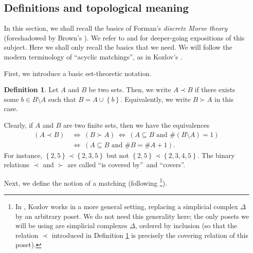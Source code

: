 \documentclass[12pt]{amsart}
\theoremstyle{definition}
\newtheorem{definition}[theorem]{Definition}
\begin{document}
\subsection{Definitions and topological meaning}

In this section, we shall recall the basics of Forman's \emph{discrete Morse
theory} (foreshadowed by Brown's \cite{Brown92}). We refer to
\cite{Forman-user} and \cite{Kozlov20} for deeper-going expositions of this
subject. Here we shall only recall the basics that we need. We will follow the
modern terminology of \textquotedblleft acyclic matchings\textquotedblright,
as in Kozlov's \cite{Kozlov20}.

First, we introduce a basic set-theoretic notation.

\begin{definition}
\label{def.succ}
Let $A$ and $B$ be two sets. Then, we write $A\prec B$ if
there exists some $b\in B\setminus A$ such that $B=A\cup\left\{  b\right\}  $.
Equivalently, we write $B\succ A$ in this case.
\end{definition}

Clearly, if $A$ and $B$ are two finite sets, then we have the equivalences
\begin{align*}
\left(  A\prec B\right)  \  &  \Longleftrightarrow\ \left(  B\succ A\right)
\ \Longleftrightarrow\ \left(  A\subseteq B\text{ and }\#\left(  B\setminus
A\right)  =1\right) \\
&  \Longleftrightarrow\ \left(  A\subseteq B\text{ and }\#B=\#A+1\right)  .
\end{align*}
For instance, $\left\{  2,5\right\}  \prec\left\{  2,3,5\right\}  $ but not
$\left\{  2,5\right\}  \prec\left\{  2,3,4,5\right\}  $. The binary relations
$\prec$ and $\succ$ are called \textquotedblleft is covered
by\textquotedblright\ and \textquotedblleft covers\textquotedblright.

Next, we define the notion of a matching (following \cite[Definition
10.6]{Kozlov20}\footnote{In \cite[Definition 10.6]{Kozlov20}, Kozlov works in
a more general setting, replacing a simplicial complex $\Delta$ by an
arbitrary poset. We do not need this generality here; the only posets we will
be using are simplicial complexes $\Delta$, ordered by inclusion (so that the
relation $\prec$ introduced in Definition \ref{def.succ} is precisely the
covering relation of this poset).}).
\end{document}
